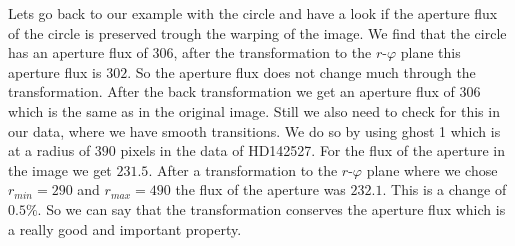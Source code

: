 Lets go back to our example with the circle and have a look if the aperture flux of the circle is preserved trough the warping of the image. We find that the circle has an aperture flux of $306$, after the transformation to the $r$-$\varphi$ plane this aperture flux is $302$. So the aperture flux does not change much through the transformation. After the back transformation we get an aperture flux of $306$ which is the same as in the original image. Still we also need to check for this in our data, where we have smooth transitions. We do so by using ghost 1 which is at a radius of $390$ pixels in the data of HD142527. For the flux of the aperture in the image we get $231.5$. After a transformation to the $r$-$\varphi$ plane where we chose $r_{min}=290$ and $r_{max}=490$ the flux of the aperture was $232.1$. This is a change of $0.5 \%$. So we can say that the transformation conserves the aperture flux which is a really good and important property.